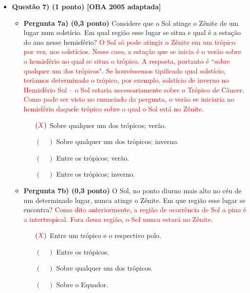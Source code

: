 \documentclass[a4paper, 12pt]{article}
\newcommand{\red}[1]{\textcolor{red}{#1}}
\begin{document}
\begin{flushleft}
\begin{itemize}
            \item \textbf{Questão 7) (1 ponto) [OBA 2005 adaptada]}
                \begin{itemize}
                    \item \textbf{Pergunta 7a) (0,3 ponto)} Considere que o Sol atinge o Zênite de um lugar num solstício. Em qual região esse lugar se situa e qual é a estação do ano nesse hemisfério?
                        \linebreak \red{O  Sol  só  pode  atingir  o  Zênite  em  um  trópico  por  vez,  nos  solstícios. Nesse caso, a estação que se inicia é o verão sobre o hemisfério no qual se situa o trópico. A resposta, portanto  é  ``sobre  qualquer  um  dos  trópicos".  Se  houvéssemos  tipificado  qual  solstício,  teríamos  determinado o trópico, por exemplo, solstício de inverno no Hemisfério Sul – o Sol estaria necessariamente sobre o Trópico de Câncer. Como  pode  ser  visto  no enunciado da pergunta,  o  verão  se  iniciaria  no  hemisfério  daquele  trópico sobre o qual o Sol está no Zênite.}
                        \begin{itemize}
                            \item[$(\red{X})$] Sobre qualquer um dos trópicos; verão.
                            \item[$(\quad)$] Sobre qualquer um dos trópicos; inverno.
                            \item[$(\quad)$] Entre os trópicos; verão.
                            \item[$(\quad)$] Entre os trópicos; inverno.
                        \end{itemize}
                    \item \textbf{Pergunta 7b) (0,3 ponto)} O Sol, no ponto diurno mais alto no céu de um determinado lugar, nunca atinge o Zênite. Em que região esse lugar se encontra?
                        \linebreak \red{Como dito anteriormente, a região de ocorrência de Sol a pino é a intertropical. Fora dessa região, o Sol nunca estará no Zênite.}
                        \begin{itemize}
                            \item[$(\red{X})$] Entre um trópico e o respectivo polo.
                            \item[$(\quad)$] Entre os trópicos.
                            \item[$(\quad)$] Sobre qualquer um dos trópicos.
                            \item[$(\quad)$] Sobre o Equador.

\end{itemize}
\end{itemize}
\end{itemize}
\end{flushleft}
\end{document}
